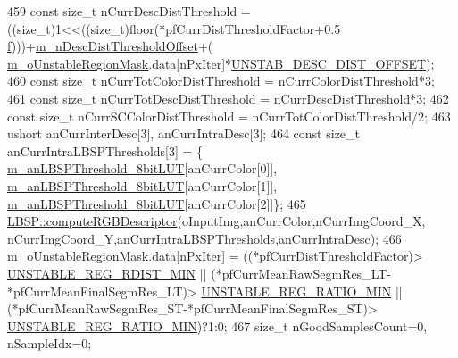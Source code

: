 \begin{DoxyCode}
459             \textcolor{keyword}{const} \textcolor{keywordtype}{size\_t} nCurrDescDistThreshold = ((size\_t)1<<((\textcolor{keywordtype}{size\_t})floor(*pfCurrDistThresholdFactor+0.5
      \mbox{\hyperlink{rings_8cpp_a77369fc4d5326a16d2c603e032023528}{f}})))+\mbox{\hyperlink{class_background_subtractor_su_b_s_e_n_s_e_a79fe0f1657cd613b975d62f73e749ec2}{m\_nDescDistThresholdOffset}}+(
      \mbox{\hyperlink{class_background_subtractor_su_b_s_e_n_s_e_acfaf4c3c5aedbed8bd302444b4a4f8dd}{m\_oUnstableRegionMask}}.data[nPxIter]*\mbox{\hyperlink{_background_subtractor_su_b_s_e_n_s_e_8cpp_af189e5399183f3cfa1dee820fb2fa8fc}{UNSTAB\_DESC\_DIST\_OFFSET}});
460             \textcolor{keyword}{const} \textcolor{keywordtype}{size\_t} nCurrTotColorDistThreshold = nCurrColorDistThreshold*3;
461             \textcolor{keyword}{const} \textcolor{keywordtype}{size\_t} nCurrTotDescDistThreshold = nCurrDescDistThreshold*3;
462             \textcolor{keyword}{const} \textcolor{keywordtype}{size\_t} nCurrSCColorDistThreshold = nCurrTotColorDistThreshold/2;
463             ushort anCurrInterDesc[3], anCurrIntraDesc[3];
464             \textcolor{keyword}{const} \textcolor{keywordtype}{size\_t} anCurrIntraLBSPThresholds[3] = \{
      \mbox{\hyperlink{class_background_subtractor_l_b_s_p_aefe69d94f08b2c4ba73ad1d254ad9153}{m\_anLBSPThreshold\_8bitLUT}}[anCurrColor[0]],
      \mbox{\hyperlink{class_background_subtractor_l_b_s_p_aefe69d94f08b2c4ba73ad1d254ad9153}{m\_anLBSPThreshold\_8bitLUT}}[anCurrColor[1]],
      \mbox{\hyperlink{class_background_subtractor_l_b_s_p_aefe69d94f08b2c4ba73ad1d254ad9153}{m\_anLBSPThreshold\_8bitLUT}}[anCurrColor[2]]\};
465             \mbox{\hyperlink{class_l_b_s_p_a27a44cb6f6e3015ee26047bd3d84f892}{LBSP::computeRGBDescriptor}}(oInputImg,anCurrColor,nCurrImgCoord\_X,
      nCurrImgCoord\_Y,anCurrIntraLBSPThresholds,anCurrIntraDesc);
466             \mbox{\hyperlink{class_background_subtractor_su_b_s_e_n_s_e_acfaf4c3c5aedbed8bd302444b4a4f8dd}{m\_oUnstableRegionMask}}.data[nPxIter] = ((*pfCurrDistThresholdFactor)>
      \mbox{\hyperlink{_background_subtractor_su_b_s_e_n_s_e_8cpp_a6168b44590b3d4a1fdcee44fe0755f39}{UNSTABLE\_REG\_RDIST\_MIN}} || (*pfCurrMeanRawSegmRes\_LT-*pfCurrMeanFinalSegmRes\_LT)>
      \mbox{\hyperlink{_background_subtractor_su_b_s_e_n_s_e_8cpp_acaad1bde74ca3c5a5c43c0e8deea2313}{UNSTABLE\_REG\_RATIO\_MIN}} || (*pfCurrMeanRawSegmRes\_ST-*pfCurrMeanFinalSegmRes\_ST)>
      \mbox{\hyperlink{_background_subtractor_su_b_s_e_n_s_e_8cpp_acaad1bde74ca3c5a5c43c0e8deea2313}{UNSTABLE\_REG\_RATIO\_MIN}})?1:0;
467             \textcolor{keywordtype}{size\_t} nGoodSamplesCount=0, nSampleIdx=0;

\end{DoxyCode}

